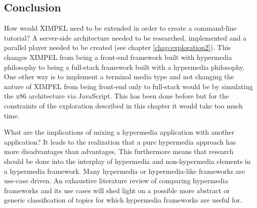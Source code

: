 \subsection{Conclusion}
How would XIMPEL need to be extended in order to create a command-line tutorial? A server-side architecture needed to be researched, implemented and a parallel player needed to be created (see chapter \ref{chap:exploration2}). This changes XIMPEL from being a front-end framework built with hypermedia philosophy to being a full-stack framework built with a hypermedia philosophy. One other way is to implement a terminal media type and not changing the nature of XIMPEL from being front-end only to full-stack would be by simulating the x86 architecture via JavaScript. This has been done before but for the constraints of the exploration described in this chapter it would take too much time.

What are the implications of mixing a hypermedia application with another application? It leads to the realization that a pure hypermedia approach has more disadvantages than advantages. This furthermore means that research should be done into the interplay of hypermedia and non-hypermedia elements in a hypermedia framework. Many hypermedia or hypermedia-like frameworks are use-case driven. An exhaustive literature review of comparing hypermedia frameworks and its use cases will shed light on a possible more abstract or generic classification of topics for which hypermedia frameworks are useful for.